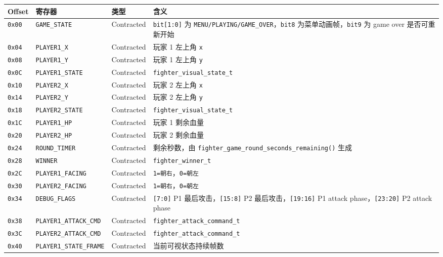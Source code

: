 \documentclass[12pt,a4paper]{ctexart}
\begin{document}
\begin{longtable}{>{\raggedright\arraybackslash}p{} >{\raggedright\arraybackslash}p{} >{\raggedright\arraybackslash}p{} >{\raggedright\arraybackslash}p{}}
\toprule
Offset & 寄存器 & 类型 & 含义 \\
\midrule
\endhead
\texttt{0x00} & \texttt{GAME\_STATE} & Contracted & \texttt{bit[1:0]} 为 \texttt{MENU/PLAYING/GAME\_OVER}，\texttt{bit8} 为菜单动画帧，\texttt{bit9} 为 game over 是否可重新开始 \\
\texttt{0x04} & \texttt{PLAYER1\_X} & Contracted & 玩家 1 左上角 \texttt{x} \\
\texttt{0x08} & \texttt{PLAYER1\_Y} & Contracted & 玩家 1 左上角 \texttt{y} \\
\texttt{0x0C} & \texttt{PLAYER1\_STATE} & Contracted & \texttt{fighter\_visual\_state\_t} \\
\texttt{0x10} & \texttt{PLAYER2\_X} & Contracted & 玩家 2 左上角 \texttt{x} \\
\texttt{0x14} & \texttt{PLAYER2\_Y} & Contracted & 玩家 2 左上角 \texttt{y} \\
\texttt{0x18} & \texttt{PLAYER2\_STATE} & Contracted & \texttt{fighter\_visual\_state\_t} \\
\texttt{0x1C} & \texttt{PLAYER1\_HP} & Contracted & 玩家 1 剩余血量 \\
\texttt{0x20} & \texttt{PLAYER2\_HP} & Contracted & 玩家 2 剩余血量 \\
\texttt{0x24} & \texttt{ROUND\_TIMER} & Contracted & 剩余秒数，由 \texttt{fighter\_game\_round\_seconds\_remaining()} 生成 \\
\texttt{0x28} & \texttt{WINNER} & Contracted & \texttt{fighter\_winner\_t} \\
\texttt{0x2C} & \texttt{PLAYER1\_FACING} & Contracted & \texttt{1=朝右}，\texttt{0=朝左} \\
\texttt{0x30} & \texttt{PLAYER2\_FACING} & Contracted & \texttt{1=朝右}，\texttt{0=朝左} \\
\texttt{0x34} & \texttt{DEBUG\_FLAGS} & Contracted & \texttt{[7:0]} P1 最后攻击，\texttt{[15:8]} P2 最后攻击，\texttt{[19:16]} P1 attack phase，\texttt{[23:20]} P2 attack phase \\
\texttt{0x38} & \texttt{PLAYER1\_ATTACK\_CMD} & Contracted & \texttt{fighter\_attack\_command\_t} \\
\texttt{0x3C} & \texttt{PLAYER2\_ATTACK\_CMD} & Contracted & \texttt{fighter\_attack\_command\_t} \\
\texttt{0x40} & \texttt{PLAYER1\_STATE\_FRAME} & Contracted & 当前可视状态持续帧数 \\

\end{longtable}
\end{document}

